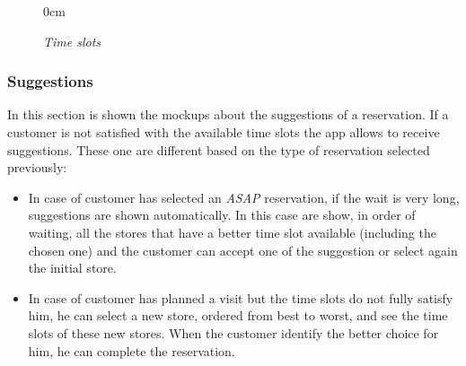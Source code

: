 \documentclass{article}
\begin{document}
\begin{figure}[!h]
\begin{adjustwidth} {0cm}{}
			\end{adjustwidth}
			\caption{\emph{Time slots}}
		\end{figure}
		
		\newpage
		
		\subsubsection{Suggestions}
		In this section is shown the mockups about the suggestions of a reservation. If a customer is not satisfied with the available time slots the app allows to receive suggestions. These one are different based on the type of reservation selected previously:
		\begin{itemize}
			\item In case of customer has selected an \emph{ASAP} reservation, if the wait is very long, suggestions are shown automatically. In this case are show, in order of waiting, all the stores that have a better time slot available (including the chosen one) and the customer can accept one of the suggestion or select again the initial store.
			\item In case of customer has planned a visit but the time slots do not fully satisfy him, he can select a new store, ordered from best to worst, and see the time slots of these new stores. When the customer identify the better choice for him, he can complete the reservation.
		\end{itemize}
		\bigskip
\end{document}
